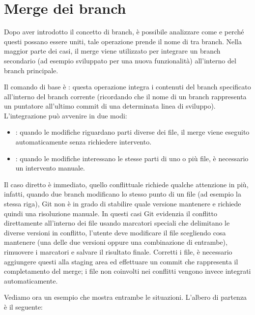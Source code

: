\section{Merge dei branch}
\label{sec:merge-branch}

Dopo aver introdotto il concetto di branch, è possibile analizzare come e perché questi possano essere uniti, tale operazione prende il nome di  tra branch. Nella maggior parte dei casi, il merge viene utilizzato per integrare un branch secondario (ad esempio sviluppato per una nuova funzionalità) all'interno del branch principale.

Il comando di base è : questa operazione integra i contenuti del branch specificato all'interno del branch corrente (ricordando che il nome di un branch rappresenta un puntatore all'ultimo commit di una determinata linea di sviluppo). 
L'integrazione può avvenire in due modi:
\begin{itemize}
	\item {}: quando le modifiche riguardano parti diverse dei file, il merge viene eseguito automaticamente senza richiedere intervento.
	\item {}: quando le modifiche interessano le stesse parti di uno o più file, è necessario un intervento manuale.
\end{itemize}
Il caso diretto è immediato, quello conflittuale richiede qualche attenzione in più, infatti, quando due branch modificano lo stesso punto di un file (ad esempio la stessa riga), Git non è in grado di stabilire quale versione mantenere e richiede quindi una risoluzione manuale. In questi casi Git evidenzia il conflitto direttamente all'interno dei file usando marcatori speciali che delimitano le diverse versioni in conflitto, l'utente deve modificare il file scegliendo cosa mantenere (una delle due versioni oppure una combinazione di entrambe), rimuovere i marcatori e salvare il risultato finale. Corretti i file, è necessario aggiungere questi alla staging area ed effettuare un commit che rappresenta il completamento del merge; i file non coinvolti nei conflitti vengono invece integrati automaticamente.

Vediamo ora un esempio che mostra entrambe le situazioni. L'albero di partenza è il seguente:

